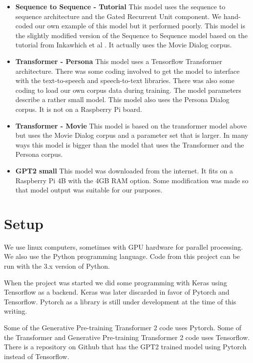\begin{itemize}
	\item \textbf{Sequence to Sequence - Tutorial} This model uses the sequence to sequence architecture and the Gated Recurrent Unit component. We hand-coded our own example of this model but it performed poorly. This model is the slightly modified version of the Sequence to Sequence model based on the tutorial from Inkawhich et al \cite{2018Inkawhich}. It actually uses the Movie Dialog corpus. 
	\item \textbf{Transformer - Persona} This model uses a Tensorflow Transformer architecture. There was some coding involved to get the model to interface with the text-to-speech and speech-to-text libraries. There was also some coding to load our own corpus data during training. The model parameters describe a rather small model. This model also uses the Persona Dialog corpus. It is not on a Raspberry Pi board.
	\item \textbf{Transformer - Movie} This model is based on the transformer model above but uses the Movie Dialog corpus and a parameter set that is larger. In many ways this model is bigger than the model that uses the Transformer and the Persona corpus.
	\item \textbf{GPT2 small} This model was downloaded from the internet. It fits on a Raspberry Pi 4B with the 4GB RAM option. Some modification was made so that model output was suitable for our purposes.
\end{itemize}



\section{Setup}

We use linux computers, sometimes with \ac{GPU} hardware for parallel processing. We also use the Python programming language. Code from this project can be run with the 3.x version of Python.

When the project was started we did some programming with Keras using Tensorflow as a backend. Keras was later discarded in favor of Pytorch and Tensorflow. Pytorch as a library is still under development at the time of this writing.

Some of the Generative Pre-training Transformer 2 code uses Pytorch. Some of the Transformer and Generative Pre-training Transformer 2 code uses Tensorflow. There is a repository on Github that has the GPT2 trained model using Pytorch instead of Tensorflow.

